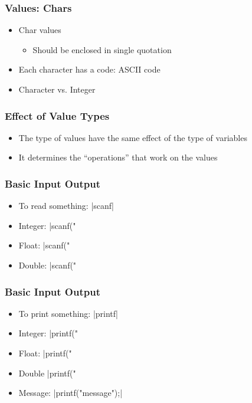 \documentclass{../c-lecture}
\begin{document}
\begin{frame}
  \frametitle{Values: Chars}
  \begin{itemize}
    \item Char values
    \begin{itemize}
      \item Should be enclosed in single quotation
    \end{itemize}
    \item Each character has a code: ASCII code
    \item Character vs. Integer
  \end{itemize}
\end{frame}

\begin{frame}
  \frametitle{Effect of Value Types}
  \begin{itemize}
    \item The type of values have the same effect of the type of variables
    \item It determines the “operations” that work on the values
  \end{itemize}
\end{frame}

\begin{frame}[fragile]
  \frametitle{Basic Input Output}
  \begin{itemize}
    \item To read something: |scanf|
    \item Integer: |scanf("%
    \item Float: |scanf("%
    \item Double: |scanf("%
  \end{itemize}
\end{frame}

\begin{frame}[fragile]
  \frametitle{Basic Input Output}
  \begin{itemize}
    \item To print something: |printf|
    \item Integer: |printf("%
    \item Float: |printf("%
    \item Double |printf("%
    \item Message: |printf("message");|
  \end{itemize}
\end{frame}
\end{document}
